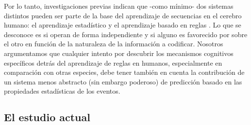 
Por lo tanto, investigaciones previas indican que -como mínimo- dos sistemas distintos pueden ser parte de la base del aprendizaje de secuencias en el cerebro humano: el aprendizaje estadístico y el aprendizaje basado en reglas \cite{f4,f67,f85}. Lo que se desconoce es si operan de forma independiente y si alguno es favorecido por sobre el otro en función de la naturaleza de la información a codificar. Nosotros argumentamos que cualquier intento por descubrir los mecanismos cognitivos específicos detrás del aprendizaje de reglas en humanos, especialmente en comparación con otras especies, debe tener también en cuenta la contribución de un sistema menos abstracto (sin embargo poderoso) de predicción basado en las propiedades estadísticas de los eventos. 

\subsection{El estudio actual}


